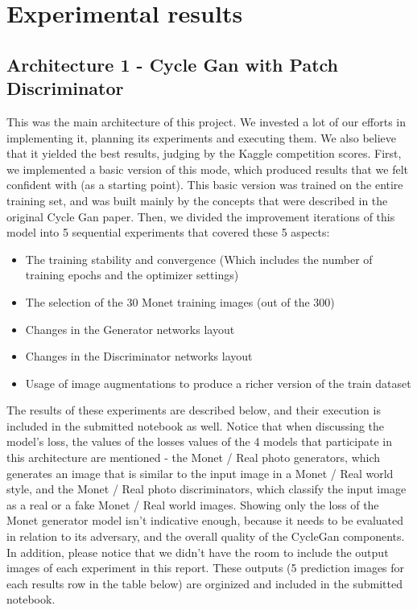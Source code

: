 \documentclass{article}
\begin{document}
\section{Experimental results}

\subsection{Architecture 1 - Cycle Gan with Patch Discriminator}
This was the main architecture of this project. We invested a lot of our efforts in implementing it, planning its experiments and executing them. We also believe that it yielded the best results, judging by the Kaggle competition scores. First, we implemented a basic version of this mode, which produced results that we felt confident with (as a starting point). This basic version was trained on the entire training set, and was built mainly by the concepts that were described in the original Cycle Gan paper. Then, we divided the improvement iterations of this model into 5 sequential experiments that covered these 5 aspects:
\begin{itemize}
    \item The training stability and convergence (Which includes the number of training epochs and the optimizer settings)
    \item The selection of the 30 Monet training images (out of the 300)
    \item Changes in the Generator networks layout
    \item Changes in the Discriminator networks layout
    \item Usage of image augmentations to produce a richer version of the train dataset
\end{itemize}
The results of these experiments are described below, and their execution is included in the submitted notebook as well. Notice that when discussing the model’s loss, the values of the losses values of the 4 models that participate in this architecture are mentioned - the Monet / Real photo generators, which generates an image that is similar to the input image in a Monet / Real world style, and the Monet / Real photo discriminators, which classify the input image as a real or a fake Monet / Real world images. Showing only the loss of the Monet generator model isn’t indicative enough, because it needs to be evaluated in relation to its adversary, and the overall quality of the CycleGan components.
In addition, please notice that we didn't have the room to include the output images of each experiment in this report. These outputs (5 prediction images for each results row in the table below) are orginized and included in the submitted notebook.
\end{document}

